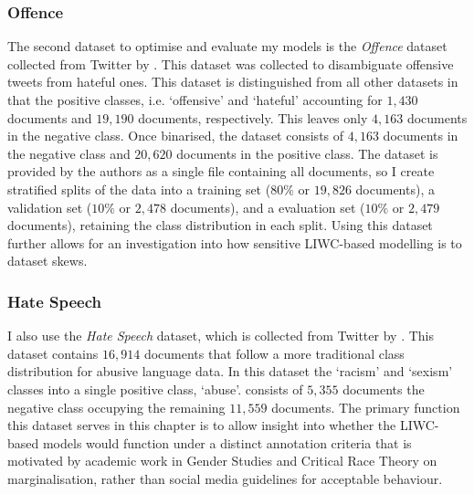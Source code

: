 \subsubsection{Offence}
The second dataset  to optimise and evaluate my models is the \textit{Offence} dataset collected from Twitter by \citet{Davidson:2017}.
This dataset was collected to disambiguate offensive tweets from hateful ones.
This dataset is distinguished from all other datasets in that the positive classes, i.e. `offensive' and `hateful' accounting for $1,430$ documents and $19,190$ documents, respectively.
This leaves only $4,163$ documents in the negative class.
Once binarised, the dataset consists of $4,163$ documents in the negative class and $20,620$ documents in the positive class.
The dataset is provided by the authors as a single file containing all documents, so I create stratified splits of the data into a training set ($80\%$ or $19,826$ documents), a validation set ($10\%$ or $2,478$ documents), and a evaluation set ($10\%$ or $2,479$ documents), retaining the class distribution in each split.
Using this dataset further allows for an investigation into how sensitive LIWC-based modelling is to dataset skews.

\subsubsection{Hate Speech}
I also use the \textit{Hate Speech} dataset, which is collected from Twitter by \citet{Waseem-Hovy:2016}.
This dataset contains $16,914$ documents that follow a more traditional class distribution for abusive language data.
In this dataset  the  `racism' and `sexism' classes into a single positive class, `abuse'. 
 consists of $5,355$ documents  the negative class occupying the remaining $11,559$ documents.
The primary function  this dataset serves in this chapter is to allow  insight into whether the LIWC-based models would function under a distinct annotation criteria that is motivated by academic work in Gender Studies and Critical Race Theory on marginalisation, rather than social media guidelines for acceptable behaviour.

